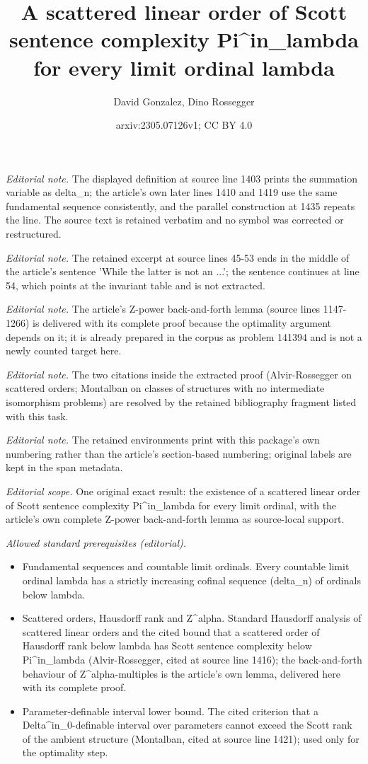 \documentclass[10pt,a4paper]{amsart}
\title{A scattered linear order of Scott sentence complexity Pi\textasciicircum{}in\_lambda for every limit ordinal lambda}
\author{David Gonzalez, Dino Rossegger}
\date{arxiv:2305.07126v1; CC BY 4.0}
\begin{document}
\maketitle
\noindent\textit{Editorial note.} The displayed definition at source line 1403 prints the summation variable as delta\_n; the article's own later lines 1410 and 1419 use the same fundamental sequence consistently, and the parallel construction at 1435 repeats the line. The source text is retained verbatim and no symbol was corrected or restructured.\par\medskip
\noindent\textit{Editorial note.} The retained excerpt at source lines 45-53 ends in the middle of the article's sentence 'While the latter is not an ...'; the sentence continues at line 54, which points at the invariant table and is not extracted.\par\medskip
\noindent\textit{Editorial note.} The article's Z-power back-and-forth lemma (source lines 1147-1266) is delivered with its complete proof because the optimality argument depends on it; it is already prepared in the corpus as problem 141394 and is not a newly counted target here.\par\medskip
\noindent\textit{Editorial note.} The two citations inside the extracted proof (Alvir-Rossegger on scattered orders; Montalban on classes of structures with no intermediate isomorphism problems) are resolved by the retained bibliography fragment listed with this task.\par\medskip
\noindent\textit{Editorial note.} The retained environments print with this package's own numbering rather than the article's section-based numbering; original labels are kept in the span metadata.\par\medskip
\noindent\textit{Editorial scope.} One original exact result: the existence of a scattered linear order of Scott sentence complexity Pi\textasciicircum{}in\_lambda for every limit ordinal, with the article's own complete Z-power back-and-forth lemma as source-local support.\par\medskip
\noindent\textit{Allowed standard prerequisites (editorial).}\begin{itemize}
\item Fundamental sequences and countable limit ordinals. Every countable limit ordinal lambda has a strictly increasing cofinal sequence (delta\_n) of ordinals below lambda.
\item Scattered orders, Hausdorff rank and Z\textasciicircum{}alpha. Standard Hausdorff analysis of scattered linear orders and the cited bound that a scattered order of Hausdorff rank below lambda has Scott sentence complexity below Pi\textasciicircum{}in\_lambda (Alvir-Rossegger, cited at source line 1416); the back-and-forth behaviour of Z\textasciicircum{}alpha-multiples is the article's own lemma, delivered here with its complete proof.
\item Parameter-definable interval lower bound. The cited criterion that a Delta\textasciicircum{}in\_0-definable interval over parameters cannot exceed the Scott rank of the ambient structure (Montalban, cited at source line 1421); used only for the optimality step.
\end{itemize}\medskip
\end{document}
